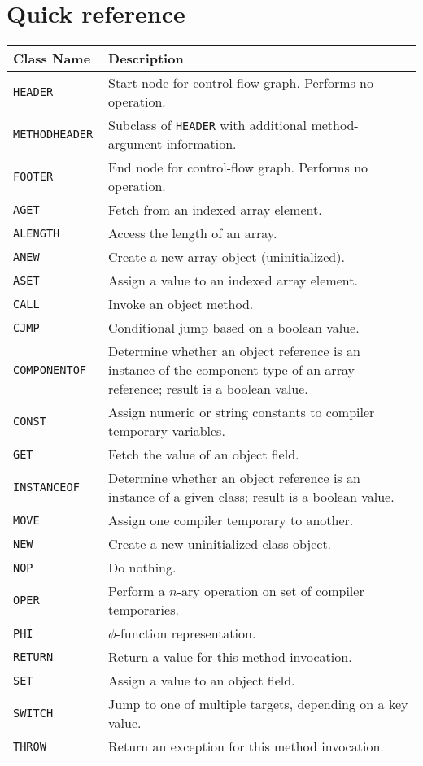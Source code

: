 \documentclass[11pt,notitlepage,twocolumn,twoside]{article}
\newcommand{\phifunction}{$\phi$-function}
\begin{document}
\onecolumn\appendix\section{Quick reference}
\label{sec:quads}
\begin{tabular}{p{1.25in}p{4.5in}} 
\small\bf Class Name & \small\bf Description \\ \hline
\tt HEADER & Start node for control-flow graph.  Performs no operation.\\
\tt METHODHEADER & Subclass of \texttt{HEADER} with additional 
                   method-argument information.\\
\tt FOOTER & End node for control-flow graph.  Performs no operation.\\ \hline
\tt AGET & Fetch from an indexed array element.\\
\tt ALENGTH & Access the length of an array. \\
\tt ANEW & Create a new array object (uninitialized). \\
\tt ASET & Assign a value to an indexed array element. \\
\tt CALL & Invoke an object method. \\
\tt CJMP & Conditional jump based on a boolean value. \\
\tt COMPONENTOF & Determine whether an object reference is an instance
          of the component type of an array reference; result is a boolean
          value. \\
\tt CONST & Assign numeric or string constants to 
            compiler temporary variables. \\
\tt GET & Fetch the value of an object field. \\
\tt INSTANCEOF & Determine whether an object reference is an instance of a
                 given class; result is a boolean value. \\
\tt MOVE & Assign one compiler temporary to another. \\
\tt NEW  & Create a new uninitialized class object. \\
\tt NOP  & Do nothing. \\
\tt OPER & Perform a $n$-ary operation on set of compiler temporaries.\\
\tt PHI  & \phifunction{} representation.\\
\tt RETURN & Return a value for this method invocation.\\
\tt SET  & Assign a value to an object field. \\
\tt SWITCH & Jump to one of multiple targets, depending on a key value. \\
\tt THROW & Return an exception for this method invocation. \\
\hline
\end{tabular}
\end{document}
